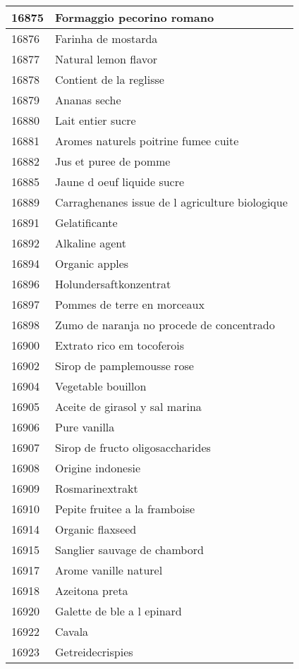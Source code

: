 \begin{longtable}{|l|l|}
16875 & Formaggio pecorino romano \\ \hline 
16876 & Farinha de mostarda \\ \hline 
16877 & Natural lemon flavor \\ \hline 
16878 & Contient de la reglisse \\ \hline 
16879 & Ananas seche \\ \hline 
16880 & Lait entier sucre \\ \hline 
16881 & Aromes naturels poitrine fumee cuite \\ \hline 
16882 & Jus et puree de pomme \\ \hline 
16885 & Jaune d oeuf liquide sucre \\ \hline 
16889 & Carraghenanes  issue de l agriculture biologique \\ \hline 
16891 & Gelatificante \\ \hline 
16892 & Alkaline agent \\ \hline 
16894 & Organic apples \\ \hline 
16896 & Holundersaftkonzentrat \\ \hline 
16897 & Pommes de terre en morceaux \\ \hline 
16898 & Zumo de naranja no procede de concentrado \\ \hline 
16900 & Extrato rico em tocoferois \\ \hline 
16902 & Sirop de pamplemousse rose \\ \hline 
16904 & Vegetable bouillon \\ \hline 
16905 & Aceite de girasol y sal marina \\ \hline 
16906 & Pure vanilla \\ \hline 
16907 & Sirop de fructo oligosaccharides \\ \hline 
16908 & Origine indonesie \\ \hline 
16909 & Rosmarinextrakt \\ \hline 
16910 & Pepite fruitee a la framboise \\ \hline 
16914 & Organic flaxseed \\ \hline 
16915 & Sanglier sauvage de chambord \\ \hline 
16917 & Arome vanille naturel \\ \hline 
16918 & Azeitona preta \\ \hline 
16920 & Galette de ble a l epinard \\ \hline 
16922 & Cavala \\ \hline 
16923 & Getreidecrispies \\ \hline 

\end{longtable}
